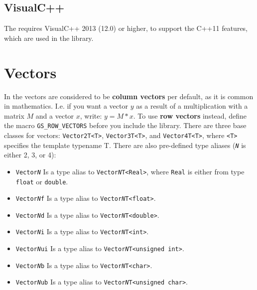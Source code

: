 \documentclass{article}
\begin{document}
\subsection*{VisualC++}

The \gausslib requires VisualC++ 2013 (12.0) or higher, to support the C++11 features, which are used in the library.



\section*{Vectors}

In the \gausslib vectors are considered to be \textbf{column vectors} per default, as it is common in mathematics.
I.e. if you want a vector $y$ as a result of a multiplication with a matrix $M$ and a vector $x$,
write: $y = M * x$.
To use \textbf{row vectors} instead, define the macro \texttt{GS\_ROW\_VECTORS} before you include the library.
There are three base classes for vectors: \texttt{Vector2T<T>}, \texttt{Vector3T<T>}, and \texttt{Vector4T<T>},
where \texttt{<T>} specifies the template typename T. There are also pre-defined type aliases
(\texttt{\textit{N}} is either 2, 3, or 4):
\begin{itemize}
	\item \texttt{Vector\textit{N}} Is a type alias to \texttt{Vector\textit{N}T<Real>}, where \texttt{Real} is either
		from type \texttt{float} or \texttt{double}.
	\item \texttt{Vector\textit{N}f} Is a type alias to \texttt{Vector\textit{N}T<float>}.
	\item \texttt{Vector\textit{N}d} Is a type alias to \texttt{Vector\textit{N}T<double>}.
	\item \texttt{Vector\textit{N}i} Is a type alias to \texttt{Vector\textit{N}T<int>}.
	\item \texttt{Vector\textit{N}ui} Is a type alias to \texttt{Vector\textit{N}T<unsigned int>}.
	\item \texttt{Vector\textit{N}b} Is a type alias to \texttt{Vector\textit{N}T<char>}.
	\item \texttt{Vector\textit{N}ub} Is a type alias to \texttt{Vector\textit{N}T<unsigned char>}.
\end{itemize}
\end{document}
